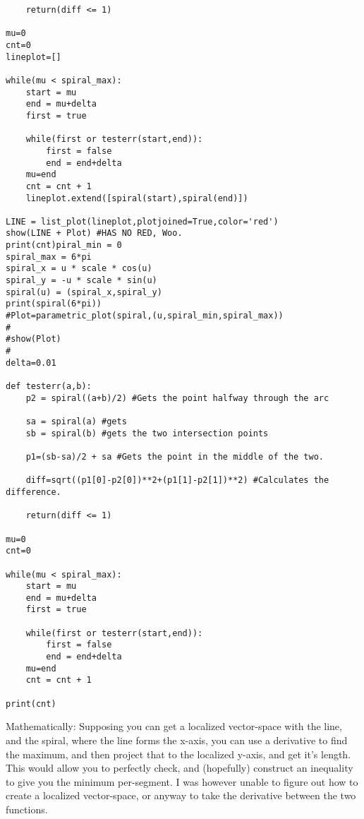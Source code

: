 \begin{enumerate}
\begin{verbatim}
    return(diff <= 1)

mu=0
cnt=0
lineplot=[]

while(mu < spiral_max):
    start = mu
    end = mu+delta
    first = true
    
    while(first or testerr(start,end)):
        first = false
        end = end+delta  
    mu=end
    cnt = cnt + 1
    lineplot.extend([spiral(start),spiral(end)])
    
LINE = list_plot(lineplot,plotjoined=True,color='red')
show(LINE + Plot) #HAS NO RED, Woo.
print(cnt)piral_min = 0
spiral_max = 6*pi
spiral_x = u * scale * cos(u)
spiral_y = -u * scale * sin(u)
spiral(u) = (spiral_x,spiral_y)
print(spiral(6*pi))
#Plot=parametric_plot(spiral,(u,spiral_min,spiral_max))
#
#show(Plot)
#
delta=0.01

def testerr(a,b):
    p2 = spiral((a+b)/2) #Gets the point halfway through the arc

    sa = spiral(a) #gets
    sb = spiral(b) #gets the two intersection points

    p1=(sb-sa)/2 + sa #Gets the point in the middle of the two.

    diff=sqrt((p1[0]-p2[0])**2+(p1[1]-p2[1])**2) #Calculates the difference.

    return(diff <= 1)

mu=0
cnt=0

while(mu < spiral_max):
    start = mu
    end = mu+delta
    first = true
    
    while(first or testerr(start,end)):
        first = false
        end = end+delta  
    mu=end
    cnt = cnt + 1

print(cnt)

\end{verbatim}

Mathematically: Supposing you can get a localized vector-space with the line, and the spiral, where the line forms the x-axis, you can use a derivative to find the maximum, and then project that to the localized y-axis, and get it's length. This would allow you to perfectly check, and (hopefully) construct an inequality to give you the minimum per-segment. 
I was however unable to figure out how to create a localized vector-space, or anyway to take the derivative between the two functions.



\end{enumerate}
